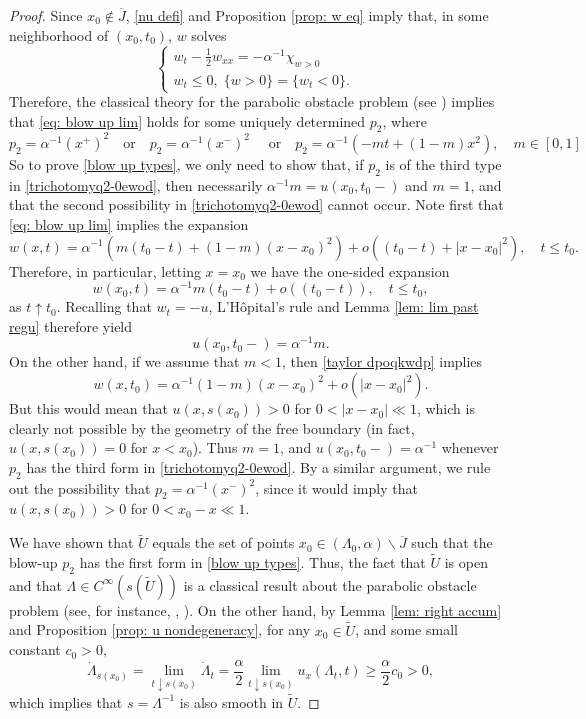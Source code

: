 \documentclass{article}
\numberwithin{equation}{section}
\numberwithin{figure}{section}
\theoremstyle{plain}
\theoremstyle{plain}
\theoremstyle{plain}
\theoremstyle{plain}
\theoremstyle{definition}
\theoremstyle{remark}
\begin{document}
\begin{proof} Since $x_0\notin \overline{J}$, \eqref{nu defi} and Proposition \ref{prop: w eq} imply that, in some neighborhood of $(x_0,t_0)$, $w$ solves
\begin{equation} \begin{cases}w_t-\frac{1}{2}w_{xx}=-\alpha^{-1}\chi_{w>0} &  \\
    w_t \leq 0, \;\{w>0\}=\{w_t<0\}.       
    \end{cases}       \end{equation}
Therefore, the classical theory for the parabolic obstacle problem (see \cite[Prop. 5.5, Thm. 3.9]{BlaDolMon}) implies that \eqref{eq: blow up lim} holds for some uniquely determined $p_2$, where 
\begin{equation} \label{trichotomyq2-0ewod}
    p_2=\alpha^{-1}(x^+)^2 \quad \text{or} \quad p_2=\alpha^{-1}(x^-)^2 \quad \text{ or} \quad p_2=\alpha^{-1}(-mt+(1-m)x^2), \quad m\in [0,1]
\end{equation}
 So to prove \eqref{blow up types}, we only need to show that, if $p_2$ is of the third type in \eqref{trichotomyq2-0ewod}, then necessarily $\alpha^{-1}m=u(x_0,t_0-)$ and $m=1$, and that the second possibility in \eqref{trichotomyq2-0ewod} cannot occur. Note first that \eqref{eq: blow up lim} implies the expansion
\begin{equation} \label{taylor dpoqkwdp} w(x,t)=\alpha^{-1}(m(t_0-t)+(1-m)(x-x_0)^2)+o((t_0-t)+|x-x_0|^2),  \quad t\leq t_0.\end{equation}
Therefore, in particular, letting $x=x_0$ we have the one-sided expansion
\[w(x_0,t)=\alpha^{-1}m(t_0-t)+o((t_0-t)),  \quad t\leq t_0,\]
as $t \uparrow t_0$. Recalling that $w_t=-u$, L'H\^opital's rule and Lemma \ref{lem: lim past regu} therefore yield
\[u(x_0,t_0-)=\alpha^{-1}m.\]
On the other hand, if we assume that $m<1$, then \eqref{taylor dpoqkwdp} implies
\[w(x,t_0)=\alpha^{-1}(1-m)(x-x_0)^2+o(|x-x_0|^2).\]
But this would mean that $u(x,s(x_0))>0$ for $0<|x-x_0|\ll1$, which is clearly not possible by the geometry of the free boundary (in fact, $u(x,s(x_0))=0$ for $x<x_0$). Thus $m=1$, and $u(x_0,t_0-)=\alpha^{-1}$ whenever $p_2$ has the third form in \eqref{trichotomyq2-0ewod}. By a similar argument, we rule out the possibility  that $p_2=\alpha^{-1}(x^{-})^2$, since it would imply that $u(x,s(x_0))>0$ for $0<x_0-x\ll1$. 

We have shown that $\tilde{U}$ equals the set of points $x_0 \in (\Lambda_0,\alpha)\backslash \overline{J}$ such that the blow-up $p_2$ has the first form in \eqref{blow up types}. Thus, the fact that $\tilde{U}$ is open and that $\Lambda \in C^{\infty}(s(\tilde{U}))$ is a classical result about the parabolic obstacle problem (see, for instance, \cite[Lem 4.2]{BlaDolMon}, \cite[Thm. II]{CafPetSha}). On the other hand, by Lemma \ref{lem: right accum} and Proposition \ref{prop: u nondegeneracy}, for any $x_0 \in \tilde{U}$, and some small constant $c_0>0$,
\begin{equation}
    \dot \Lambda_{s(x_0)}=\lim_{t\downarrow s(x_0)}\dot \Lambda_{t}=\frac{\alpha}{2}\lim_{t\downarrow s(x_0)}u_x(\Lambda_t,t) \geq \frac{\alpha}{2}c_0>0,
\end{equation}
which implies that $s=\Lambda ^{-1}$ is also smooth in $\tilde{U}$.
\end{proof}
\end{document}
